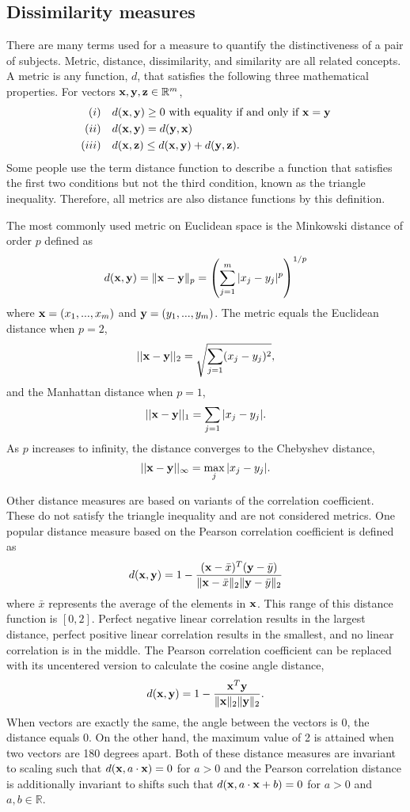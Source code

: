 \subsection{Dissimilarity measures}
There are many terms used for a measure to quantify the distinctiveness of a pair of subjects. Metric, distance, dissimilarity, and similarity are all related concepts. A metric is any function, $d$, that satisfies the following three mathematical properties. For vectors $\mathbf x,\mathbf y,\mathbf z \in\mathbb{R}^{m}$,
\begin{align*}
(i)& \quad d(\mathbf x,\mathbf y)\geq 0 \text{ with equality if and only if }\mathbf x =\mathbf y\\
(ii)& \quad d(\mathbf x,\mathbf y) = d(\mathbf y,\mathbf x)\\
(iii)&\quad d(\mathbf x,\mathbf z) \leq d(\mathbf x,\mathbf y) + d(\mathbf y,\mathbf z).
\end{align*}
Some people use the term distance function to describe a function that satisfies the first two conditions but not the third condition, known as the triangle inequality. Therefore, all metrics are also distance functions by this definition.

The most commonly used metric on Euclidean space is the Minkowski distance of order $p$ defined as
$$d(\mathbf x,\mathbf y) = \|\mathbf x - \mathbf y\|_{p} = \left(\sum^{m}_{j=1}|x_{j}-y_{j}|^{p}\right)^{1/p}$$
where $\mathbf x = (x_{1},...,x_{m})$ and $\mathbf y = (y_{1},...,y_{m})$. The metric equals the Euclidean distance when $p=2$,
$$||\mathbf x - \mathbf y||_{2}=\sqrt{\sum_{j=1}(x_{j}-y_{j})^{2}},$$
and the Manhattan distance when $p=1$,
$$||\mathbf x - \mathbf y||_{1}=\sum_{j=1}|x_{j}-y_{j}|.$$
As $p$ increases to infinity, the distance converges to the Chebyshev distance,
$$||\mathbf x - \mathbf y||_{\infty}=\max_{j}|x_{j}-y_{j}|.$$

Other distance measures are based on variants of the correlation coefficient. These do not satisfy the triangle inequality and are not considered metrics. One popular distance measure based on the Pearson correlation coefficient is defined as
$$d(\mathbf x,\mathbf y) =1 - \frac{(\mathbf x - \bar{x})^{T}(\mathbf y - \bar{y})}{\|\mathbf x - \bar{x}\|_{2}\|\mathbf y - \bar{y}\|_{2}}$$
where $\bar{x}$ represents the average of the elements in $\mathbf x$. This range of this distance function is $[0,2]$. Perfect negative linear correlation results in the largest distance, perfect positive linear correlation results in the smallest, and no linear correlation is in the middle. The Pearson correlation coefficient can be replaced with its uncentered version to calculate the cosine angle distance,
$$d(\mathbf x,\mathbf y) =1 - \frac{\mathbf x ^{T}\mathbf y }{\|\mathbf x\|_{2}\|\mathbf y \|_{2}}.$$
When vectors are exactly the same, the angle between the vectors is 0, the distance equals 0. On the other hand, the maximum value of 2 is attained when two vectors are 180 degrees apart. Both of these distance measures are invariant to scaling such that $d(\mathbf x, a\cdot \mathbf x) = 0$ for $a>0$ and the Pearson correlation distance is additionally invariant to shifts such that $d(\mathbf x, a\cdot \mathbf x +b) = 0$ for $a>0$ and $a,b\in \mathbb{R}$. 


